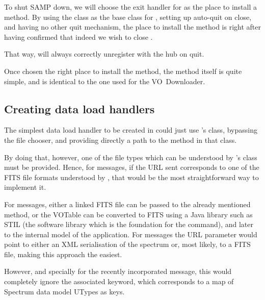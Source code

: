 			To shut SAMP down, we will choose the exit handler
			for \massa{} as the place to install a
			\shutdownSamp{} method. By using the
			 class as the base class for
			, setting up auto-quit on close,
			and having no other quit mechanism, the place
			to install the \shutdownSamp{} method is
			right after having confirmed that indeed we wish to
			close \massa{}.
			
			That way, \massa{} will always correctly unregister
			with the hub on quit.
			
			Once chosen the right place to install the
			\shutdownSamp{} method, the method itself
			is quite simple, and is identical to the one
			used for the VO~Downloader.
			
		
		\subsection{Creating data load handlers} %
		\label{sub:creating_data_load_handlers}
			
			The simplest data load handler to be created in
			\initSamp{} could just use \massa's  class,
			bypassing the file chooser, and providing directly a
			path to the  method in that class.
			
			By doing that, however, one of the file types which
			can be understood by \massa's 
			class must be provided. Hence, for 
			messages, if the URL sent corresponds to one of the
			FITS file formats understood by \massa, that  would
			be the most straightforward way to implement it.
			
			For  messages, either a
			linked FITS file can be passed to the already
			mentioned  method, or the VOTable
			can be converted to FITS using a Java library
			such as STIL (the software library which is the
			foundation for the  command), and
			later to the internal model of the application.
			For  messages
			the URL parameter would point to either an XML
			serialisation of the spectrum or, most likely,
			to a FITS file, making this approach the easiest.
			
			However, and specially for the recently incorporated
			 message, this
			would completely ignore the associated 
			keyword, which corresponds to a map of Spectrum data
			model UTypes as keys.
			
